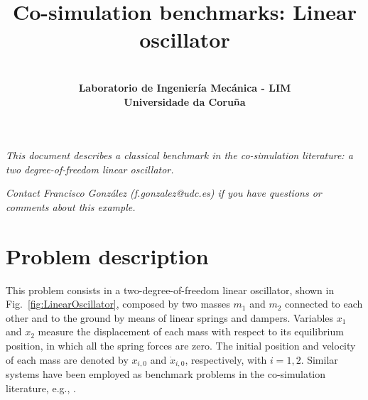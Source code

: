 \documentclass[fleqn,11pt]{article}
\begin{document}
	
	\vspace{1cm}
	
	\title{\LARGE \bf Co-simulation benchmarks: Linear oscillator}
	
	\author{\\ \bf Laboratorio de Ingenier\'ia Mec\'anica - LIM \\ \bf Universidade da Coru\~na}
	
	\maketitle
	
	{\let\newpage\relax\maketitle}
	{\thispagestyle{fancy}
		\fancyfoot[C]{}
		}
	
	\newpage
	
	\fancyhf{}
	\pagestyle{fancy}
	\fancyhead[C]{\ifodd\value{page} \fi}
	\fancyfoot[C]{\thepage}
	

\textit{
	This document describes a classical benchmark in the co-simulation literature: a two degree-of-freedom linear oscillator.
}
	
\textit{
	Contact Francisco Gonz\'alez (f.gonzalez@udc.es) if you have questions or comments about this example. 
}

\section{Problem description}
\label{ProblemDefinition}

This problem consists in a two-degree-of-freedom linear oscillator, shown in Fig.~\ref{fig:LinearOscillator}, composed by two masses $m_1$ and $m_2$ connected to each other and to the ground by means of linear springs and dampers.
Variables $x_1$ and $x_2$ measure the displacement of each mass with respect to its equilibrium position, in which all the spring forces are zero.
The initial position and velocity of each mass are denoted by $x_{i,0}$ and $\dot{x}_{i,0}$, respectively, with $i=1,2$.
Similar systems have been employed as benchmark problems in the co-simulation literature, e.g., \cite{Gonzalez2019, Gonzalez2011, Sadjina2017, Schweizer2015, Schweizer2014}.
\end{document}
